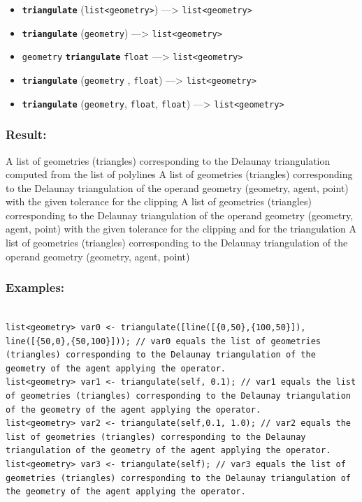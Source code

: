 \documentclass[]{book}
\providecommand{\tightlist}{%
  \setlength{\itemsep}{0pt}\setlength{\parskip}{0pt}}
\theoremstyle{definition}
\theoremstyle{definition}
\theoremstyle{definition}
\theoremstyle{remark}
\begin{document}
\begin{itemize}
\tightlist
\item
  \textbf{\texttt{triangulate}}
  (\texttt{list\textless{}geometry\textgreater{}}) ---\textgreater{}
  \texttt{list\textless{}geometry\textgreater{}}
\item
  \textbf{\texttt{triangulate}} (\texttt{geometry}) ---\textgreater{}
  \texttt{list\textless{}geometry\textgreater{}}
\item
  \texttt{geometry} \textbf{\texttt{triangulate}} \texttt{float}
  ---\textgreater{} \texttt{list\textless{}geometry\textgreater{}}
\item
  \textbf{\texttt{triangulate}} (\texttt{geometry} , \texttt{float})
  ---\textgreater{} \texttt{list\textless{}geometry\textgreater{}}
\item
  \textbf{\texttt{triangulate}} (\texttt{geometry}, \texttt{float},
  \texttt{float}) ---\textgreater{}
  \texttt{list\textless{}geometry\textgreater{}}
\end{itemize}

\subsubsection{Result:}\label{result-516}

A list of geometries (triangles) corresponding to the Delaunay
triangulation computed from the list of polylines A list of geometries
(triangles) corresponding to the Delaunay triangulation of the operand
geometry (geometry, agent, point) with the given tolerance for the
clipping A list of geometries (triangles) corresponding to the Delaunay
triangulation of the operand geometry (geometry, agent, point) with the
given tolerance for the clipping and for the triangulation A list of
geometries (triangles) corresponding to the Delaunay triangulation of
the operand geometry (geometry, agent, point)

\subsubsection{Examples:}\label{examples-371}

\begin{verbatim}
 
list<geometry> var0 <- triangulate([line([{0,50},{100,50}]), line([{50,0},{50,100}])); // var0 equals the list of geometries (triangles) corresponding to the Delaunay triangulation of the geometry of the agent applying the operator. 
list<geometry> var1 <- triangulate(self, 0.1); // var1 equals the list of geometries (triangles) corresponding to the Delaunay triangulation of the geometry of the agent applying the operator. 
list<geometry> var2 <- triangulate(self,0.1, 1.0); // var2 equals the list of geometries (triangles) corresponding to the Delaunay triangulation of the geometry of the agent applying the operator. 
list<geometry> var3 <- triangulate(self); // var3 equals the list of geometries (triangles) corresponding to the Delaunay triangulation of the geometry of the agent applying the operator.
\end{verbatim}
\end{document}
